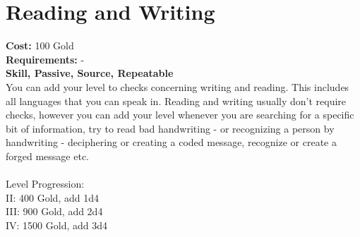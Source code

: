 \section*{Reading and Writing}
\textbf{Cost:} 100 Gold\\
\textbf{Requirements:} -\\
\textbf{Skill, Passive, Source, Repeatable}\\
You can add your level to checks concerning writing and reading. This includes all languages that you can speak in. Reading and writing usually don't require checks, however you can add your level whenever you are searching for a specific bit of information, try to read bad handwriting - or recognizing a person by handwriting - deciphering or creating a coded message, recognize or create a forged message etc.\\
\\
Level Progression:\\
II: 400 Gold, add 1d4\\
III: 900 Gold, add 2d4\\
IV: 1500 Gold, add 3d4\\